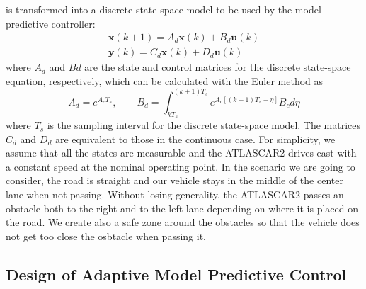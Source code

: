 \documentclass[conference, 11pt]{IEEEtran}
\begin{document}
is transformed into a discrete state-space model to be used by the model predictive controller:
\begin{equation}
\label{eqn:dynamics_ss_obstacle_avoidance_dis}
	\begin{array}{rr}
	{\textbf{x}}(k+1) =A_d \textbf{x}(k)+ B_d \textbf{u}(k)\\
	\textbf{y}(k) =C_d \textbf{x}(k) + D_d \textbf{u}(k)
	\end{array}
\end{equation}
where $A_d$ and $B d$ are the state and control matrices for the discrete state-space equation, respectively, which can be calculated with the Euler method as
\[
A_d = e^{A_cT_s},\qquad B_d = \int_{kT_s}^{(k+1)T_s} e^{A_c[(k+1)T_s-\eta]}B_c d\eta
\]
where $T_s$ is the sampling interval for the discrete state-space model. The matrices $C_d$ and $D_d$ are equivalent to those in the continuous case. For simplicity, we assume that all the states are measurable and the ATLASCAR2 drives east with a constant speed at the nominal operating point. In the scenario we are going to consider, the road is straight and our vehicle stays in the middle of the center lane when not passing. Without losing generality, the ATLASCAR2 passes an obstacle both to the right and to the left lane depending on where it is placed on the road. We create also a safe zone around the obstacles so that the vehicle does not get too close the osbtacle when passing it.

\subsection{Design of Adaptive Model Predictive Control}
\end{document}
